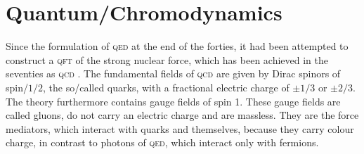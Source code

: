 \documentclass[../../index.tex]{subfiles}
\begin{document}
\section{Quantum\-/Chromodynamics}
\label{sec:quantumchromodynamics}
Since the formulation of \textsc{qed} at the end of the forties, it had been
attempted to construct a \textsc{qft} of the strong nuclear force, which has
been achieved in the seventies as \textsc{qcd}
\cite{GellMann1972,Fritzsch1973,Gross1973,Politzer1973,Weinberg1973}. The
fundamental fields of \textsc{qcd} are given by Dirac spinors of spin\-/\(1/2\),
the so\-/called quarks, with a fractional electric charge of \(\pm 1/3\) or
\(\pm 2/3\). The theory furthermore contains gauge fields of spin 1. These gauge
fields are called gluons, do not carry an electric charge and are massless. They
are the force mediators, which interact with quarks and themselves, because they
carry colour charge, in contrast to photons of \textsc{qed}, which interact only
with fermions. %
\end{document}
